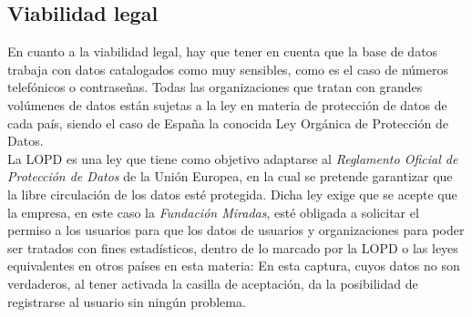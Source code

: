 \subsection{Viabilidad legal}
En cuanto a la viabilidad legal, hay que tener en cuenta que la base de datos
trabaja con datos catalogados como muy sensibles, como es el caso de números
telefónicos o contraseñas. Todas las organizaciones que tratan con grandes
volúmenes de datos están sujetas a la ley en materia de protección de datos de
cada país, siendo el caso de España la conocida Ley Orgánica de Protección de
Datos. 
\\
La LOPD es una ley que tiene como objetivo adaptarse al \textit{Reglamento
Oficial de Protección de Datos} de la Unión Europea, en la cual se pretende
garantizar que la libre circulación de los datos esté protegida. Dicha ley exige
que se acepte que la empresa, en este caso la \textit{Fundación Miradas}, esté
obligada a solicitar el permiso a los usuarios para que los datos de usuarios y
organizaciones para poder ser tratados con fines estadísticos, dentro de lo
marcado por la LOPD o las leyes equivalentes en otros países en esta materia:
 En esta captura, cuyos datos no
son verdaderos, al tener activada la casilla de aceptación, da la posibilidad de
registrarse al usuario sin ningún problema.
